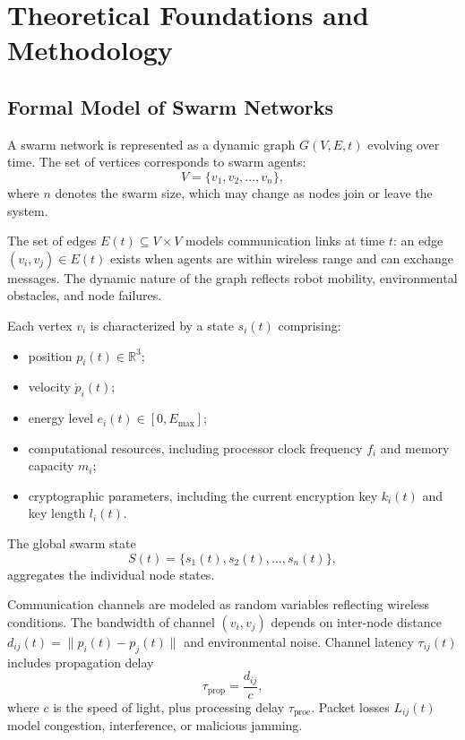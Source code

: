 \chapter{Theoretical Foundations and Methodology}
\label{chap:methodology}

\section{Formal Model of Swarm Networks}
\label{sec:formal_model}

A swarm network is represented as a dynamic graph $G(V,E,t)$ evolving over time. The set of vertices corresponds to swarm agents:
\begin{equation}
V = \{v_1, v_2, \ldots, v_n\},
\label{eq:vertices}
\end{equation}
where $n$ denotes the swarm size, which may change as nodes join or leave the system.

The set of edges $E(t) \subseteq V \times V$ models communication links at time $t$: an edge $(v_i, v_j) \in E(t)$ exists when agents are within wireless range and can exchange messages. The dynamic nature of the graph reflects robot mobility, environmental obstacles, and node failures.

Each vertex $v_i$ is characterized by a state $s_i(t)$ comprising:
\begin{itemize}
  \item position $p_i(t) \in \mathbb{R}^3$;
  \item velocity $\dot{p}_i(t)$;
  \item energy level $e_i(t) \in [0, E_{\max}]$;
  \item computational resources, including processor clock frequency $f_i$ and memory capacity $m_i$;
  \item cryptographic parameters, including the current encryption key $k_i(t)$ and key length $l_i(t)$.
\end{itemize}

The global swarm state
\begin{equation}
S(t) = \{s_1(t), s_2(t), \ldots, s_n(t)\},
\label{eq:global_state}
\end{equation}
aggregates the individual node states.

Communication channels are modeled as random variables reflecting wireless conditions. The bandwidth of channel $(v_i, v_j)$ depends on inter-node distance $d_{ij}(t) = \|p_i(t) - p_j(t)\|$ and environmental noise. Channel latency $\tau_{ij}(t)$ includes propagation delay
\begin{equation}
\tau_{\text{prop}} = \frac{d_{ij}}{c},
\label{eq:prop_delay}
\end{equation}
where $c$ is the speed of light, plus processing delay $\tau_{\text{proc}}$. Packet losses $L_{ij}(t)$ model congestion, interference, or malicious jamming.

